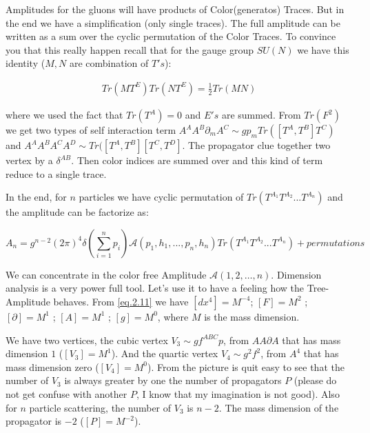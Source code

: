  
 
 Amplitudes for the gluons will have products of Color(generatos) Traces. But in the end we have a simplification (only single traces). The full amplitude can be written as a sum over the cyclic permutation of the Color Traces. To convince you that this really happen recall that for the gauge group $SU(N)$ we have this identity ($M,N$ are combination of $T's$):
 
 \begin{align}
 Tr(MT^{E})Tr(NT^{E}) = \frac{1}{2}Tr(MN) 
 \end{align} 
 
 where we used the fact that $Tr(T^{A}) = 0$ and $E's$ are summed. From $Tr(F^{2})$ we get two types of self interaction term $A^{A}A^{B}\partial_{m} A^{C}\sim g p_{m} Tr([T^{A},T^{B}]T^{C}) $ and $A^{A}A^{B}A^{C}A^{D} \sim Tr([T^{A},T^{B}][T^{C},T^{D}]$. The propagator clue together  two vertex by a $\delta ^{AB}$. Then  color indices are summed over and this kind of term reduce to a single trace.
 
 
 
 In the end, for $n$ particles we have cyclic permutation of $Tr(T^{A_{1}}T^{A_{2}}...T^{A_{n}})$ and the amplitude can be factorize as:
 
 
 \begin{equation}
 A_{n} = g^{n-2}(2\pi)^{4}\delta(\sum^{n}_{i=1} p_{i})\mathcal{A}(p_{1},h_{1},... ,p_{n},h_{n})Tr(T^{A_{1}}T^{A_{2}}...T^{A_{n}}) + permutations
 \label{eq.2.16}
 \end{equation}


We can concentrate in the color free Amplitude $\mathcal A(1,2,\dots ,n)$. Dimension analysis is a very power full tool. Let's use it to have a feeling how the Tree-Amplitude behaves. From \eqref{eq.2.11} we have $[dx^{4}] = M^{-4}$;  $[F] = M^{2}$ ; $[\partial] = M^{1}$ ; $[A] = M^{1}$ ; $[g] = M^{0}$, where $M$ is the mass dimension. 

We have two vertices, the cubic vertex $V_{3} \sim gf^{ABC} p$, from $AA\partial A$ that has mass dimension $1$ ($[V_{3}] = M^{1}$). And the quartic  vertex $V_{4} \sim g^{2} f^{2}$, from $A^{4}$ that has mass dimension zero ($[V_{4}] = M^{0}$). From the picture is quit easy to see that the number of $V_{3}$ is always greater by one the number of propagators $P$ (please do not get confuse with another $P$, I know that my imagination is not good). Also for $n$ particle scattering, the number of $V_{3}$ is $n -2$. The mass dimension of the propagator is $-2$ ($[P] = M^{-2}$).



